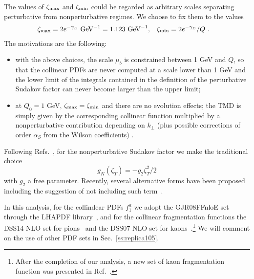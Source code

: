 \documentclass[aps,preprintnumbers,showpacs,nofootinbib,superscriptaddress,floatfix]{revtex4}
\newcommand{\T}{\perp}
\newcommand{\bT}{\zeta_T}
\newcommand{\bb}{\zeta}
\begin{document}
The values of $\bb_{\rm max}$ and
$\bb_{\rm min}$ could
be regarded as arbitrary scales separating perturbative from nonperturbative
regimes. 
We choose to fix them to the
values 
\begin{align}
\bb_{\rm max} &= 2 e^{-\gamma_E}  \text{  GeV}^{-1} = 1.123 \text{  GeV}^{-1}, 
&
\bb_{\rm min} &= 2 e^{-\gamma_E}/Q \ .
\label{e:bminmax}
\end{align} 
The motivations are the following: 
\begin{itemize}
\item{} with the above choices, the scale $\mu_b$ is
  constrained between 1 GeV and $Q$, so that the collinear PDFs are never
  computed at a scale lower than 1 GeV and the lower limit of the integrals
  contained in the definition of the perturbative Sudakov factor can never
  become larger than the upper limit;
\item{} at $Q_0 = 1$ GeV, $\bb_{\rm max} = \bb_{\rm min}$ and there are no evolution effects; the TMD is
simply given by the corresponding collinear function multiplied by a
nonperturbative contribution depending on $k_\T$ (plus possible corrections of
order $\alpha_S$ from the Wilson coefficients) .
\end{itemize} 

Following Refs.~\cite{Nadolsky:1999kb,Landry:2002ix,Konychev:2005iy}, for the
nonperturbative Sudakov factor we make the traditional choice 
\begin{equation}
g_K (\bT) = - g_2 \bT^2 / 2
\end{equation} 
with $g_2$ a free parameter. Recently, several alternative
forms have been proposed~\cite{Aidala:2014hva,Collins:2014jpa} including the
suggestion of not including such term~\cite{D'Alesio:2014vja}.  

In this analysis, for the collindear PDFs $f_1^a$ we adopt the GJR08FFnloE
set~\cite{Gluck:2007ck} through the LHAPDF library~\cite{Buckley:2014ana}, and
for the collinear fragmentation functions 
the DSS14 NLO set for
pions~\cite{deFlorian:2014xna} and the DSS07 NLO set for
kaons~\cite{deFlorian:2007aj}.\footnote{After the completion of our analysis, 
a new set of kaon
  fragmentation function was presented in Ref.~\cite{deFlorian:2017lwf}.} We
will comment on the use of other PDF sets in Sec.~\ref{ss:replica105}.
\end{document}
